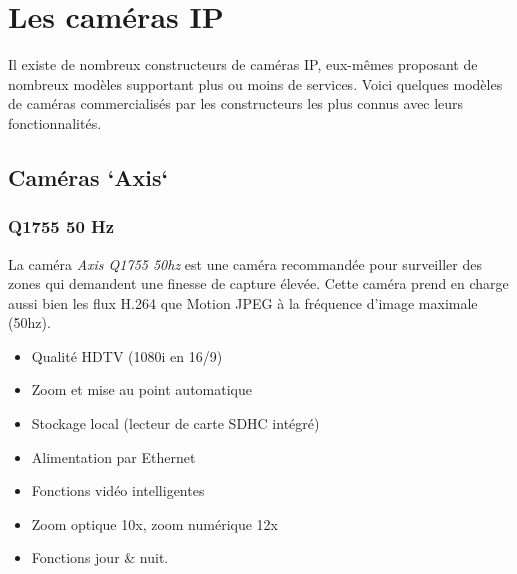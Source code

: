 \section{Les caméras IP}
Il existe de nombreux constructeurs de caméras IP, eux-mêmes proposant
 de nombreux modèles supportant plus ou moins de services. Voici quelques
 modèles de caméras commercialisés par les constructeurs les plus connus avec
 leurs fonctionnalités.
\subsection{Caméras `Axis`}
\subsubsection{Q1755 50 Hz}
La caméra \textit{Axis Q1755 50hz} est une caméra recommandée pour surveiller
des zones qui demandent une finesse de capture élevée.
Cette caméra prend en charge aussi bien les flux H.264 que Motion JPEG à la
fréquence d'image maximale (50hz).
\begin{itemize}
  \item Qualité HDTV (1080i en 16/9)
  \item Zoom et mise au point automatique
  \item Stockage local (lecteur de carte SDHC intégré)
  \item Alimentation par Ethernet
  \item Fonctions vidéo intelligentes
  \item Zoom optique 10x, zoom numérique 12x
  \item Fonctions jour \& nuit.
\end{itemize}

